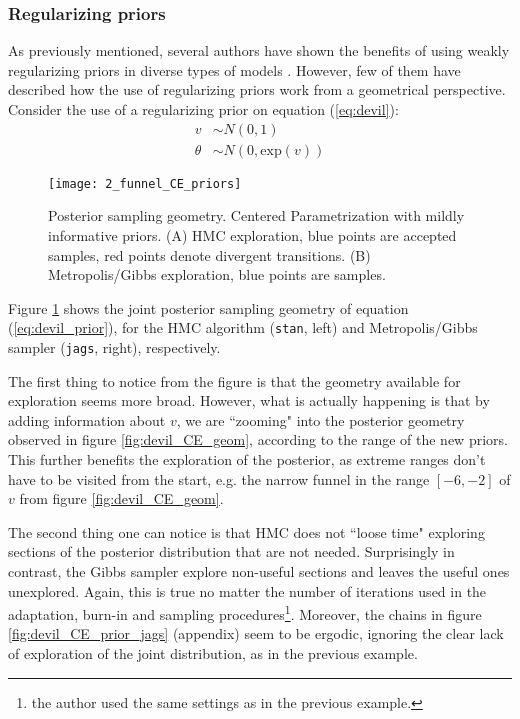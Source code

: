
\subsubsection{Regularizing priors} \label{subsub_sec:reg_prior}

As previously mentioned, several authors have shown the benefits of using weakly regularizing priors in diverse types of models \cite{McElreath_2020, Gelman_et_al_1996b, Jaynes_1985}. However, few of them have described how the use of regularizing priors work from a geometrical perspective. Consider the use of a regularizing prior on equation (\ref{eq:devil}):
%
\begin{equation} \label{eq:devil_prior}
	\begin{split}	
		v &\sim N(0, 1) \\
		\theta &\sim N(0, \text{exp}(v))
	\end{split}
\end{equation}
%
\begin{figure}[h]
	\centering
	\texttt{[image: 2\_funnel\_CE\_priors]}
	\caption[Posterior sampling geometry. Centered Parametrization with mildly informative priors.]%
	{Posterior sampling geometry. Centered Parametrization with mildly informative priors. (A) HMC exploration, blue points are accepted samples, red points denote divergent transitions. (B) Metropolis/Gibbs exploration, blue points are samples.}
	\label{fig:devil_prior_geom}
\end{figure}

Figure \ref{fig:devil_prior_geom} shows the joint posterior sampling geometry of equation (\ref{eq:devil_prior}), for the HMC algorithm (\texttt{stan}, left) and Metropolis/Gibbs sampler (\texttt{jags}, right), respectively. 

The first thing to notice from the figure is that the geometry available for exploration seems more broad. However, what is actually happening is that by adding information about $v$, we are ``zooming" into the posterior geometry observed in figure \ref{fig:devil_CE_geom}, according to the range of the new priors. This further benefits the exploration of the posterior, as extreme ranges don't have to be visited from the start, e.g. the narrow funnel in the range $[-6,-2]$ of $v$ from figure \ref{fig:devil_CE_geom}.

The second thing one can notice is that HMC does not ``loose time" exploring sections of the posterior distribution that are not needed. Surprisingly in contrast, the Gibbs sampler explore non-useful sections and leaves the useful ones unexplored. Again, this is true no matter the number of iterations used in the adaptation, burn-in and sampling procedures\footnote{the author used the same settings as in the previous example.}. Moreover, the chains in figure \ref{fig:devil_CE_prior_jags} (appendix) seem to be ergodic, ignoring the clear lack of exploration of the joint distribution, as in the previous example.

